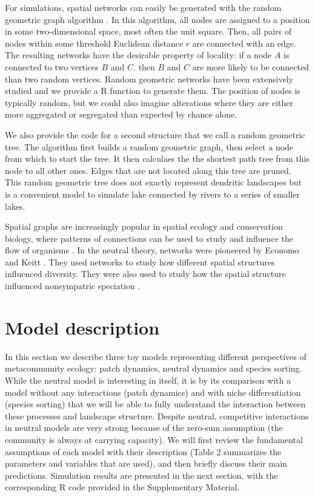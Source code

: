 \documentclass[12pt]{article}
\begin{document}
For simulations, spatial networks can easily be generated with the random
geometric graph algorithm \parencite{sed01}. In this algorithm, all nodes are
assigned to a position in some two-dimensional space, most often the unit
square. Then, all pairs of nodes within some threshold Euclidean distance $r$
are connected with an edge. The resulting networks have the desirable property
of locality: if a node $A$ is connected to two vertices $B$ and $C$. then $B$
and $C$ are more likely to be connected than two random vertices. Random
geometric networks have been extensively studied \parencite{app97a,app97b,app02a,app02b,pen03} 
and we provide a R function to generate them. The
position of nodes is typically random, but we could also imagine alterations
where they are either more aggregated or segregated than expected by chance
alone.

We also provide the code for a second structure that we call a random geometric
tree. The algorithm first builds a random geometric graph, then select a node
from which to start the tree. It then calculaes the the shortest path tree
\parencite{dij59} from this node to all other ones. Edges that are not located along
this tree are pruned. This random geometric tree does not exactly represent
dendritic landscapes but is a convenient model to simulate lake connected by
rivers to a series of smaller lakes.

Spatial graphs are increasingly popular in spatial ecology and conservation
biology, where patterns of connections can be used to study and influence the
flow of organisms \parencite{min07,fal07,min08,gar08,urb09,dal10}. In the neutral
theory, networks were pioneered by Economo and Keitt \parencite{Economo2008, eco10}. They
used networks to study how different spatial structures influenced diversity.
They were also used to study how the spatial structure influenced nonsympatric
speciation \parencite{Desjardins2012a,Desjardins2012b}.

\section*{Model description}

In this section we describe three toy models representing different
perspectives of metacommunity ecology: patch dynamics, neutral dynamics and
species sorting. While the neutral model is interesting in itself, it is by its
comparison with a model without any interactions (patch dynamics) and with niche
differentiation (species sorting) that we will be able to fully understand the
interaction between these processes and landscape structure. Despite neutral,
competitive interactions in neutral models are very strong because of the
zero-sum assumption (the community is always at carrying capacity). We will
first review the fundamental assumptions of each model with their description
(Table 2 summarizes the parameters and variables that are used), and then
briefly discuss their main predictions. Simulation results are presented in the
next section, with the corresponding R code provided in the Supplementary
Material.
\end{document}
